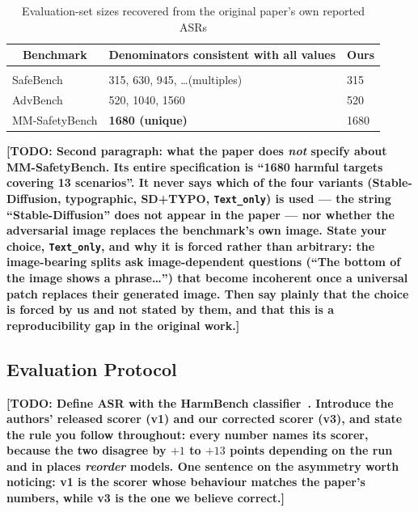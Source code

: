 \documentclass[10pt]{article} %
\newcommand{\todo}[1]{\textbf{[TODO: #1]}}
\begin{document}
\begin{table}[t]
\caption{Evaluation-set sizes recovered from the original paper's own reported ASRs}
\label{tab:denominators}
\begin{center}
\begin{tabular}{lll}
\multicolumn{1}{c}{\bf Benchmark} & \multicolumn{1}{c}{\bf Denominators consistent with all values} & \multicolumn{1}{c}{\bf Ours}
\\ \hline \\
SafeBench      & 315, 630, 945, \ldots (multiples) & 315 \\
AdvBench       & 520, 1040, 1560                   & 520 \\
MM-SafetyBench & {\bf 1680 (unique)}               & 1680 \\
\end{tabular}
\end{center}
\end{table}

\todo{Second paragraph: what the paper does \emph{not} specify about MM-SafetyBench. Its entire specification is ``1680 harmful targets covering 13 scenarios''. It never says which of the four variants (Stable-Diffusion, typographic, SD+TYPO, \texttt{Text\_only}) is used --- the string ``Stable-Diffusion'' does not appear in the paper --- nor whether the adversarial image replaces the benchmark's own image. State your choice, \texttt{Text\_only}, and why it is forced rather than arbitrary: the image-bearing splits ask image-dependent questions (``The bottom of the image shows a phrase\ldots'') that become incoherent once a universal patch replaces their generated image. Then say plainly that the choice is forced by us and not stated by them, and that this is a reproducibility gap in the original work.}

\subsection{Evaluation Protocol}
\label{sec:protocol}

\todo{Define ASR with the HarmBench classifier~\citep{mazeika2024harmbench}. Introduce the authors' released scorer (v1) and our corrected scorer (v3), and state the rule you follow throughout: every number names its scorer, because the two disagree by $+1$ to $+13$ points depending on the run and in places \emph{reorder} models. One sentence on the asymmetry worth noticing: v1 is the scorer whose behaviour matches the paper's numbers, while v3 is the one we believe correct.}
\end{document}
